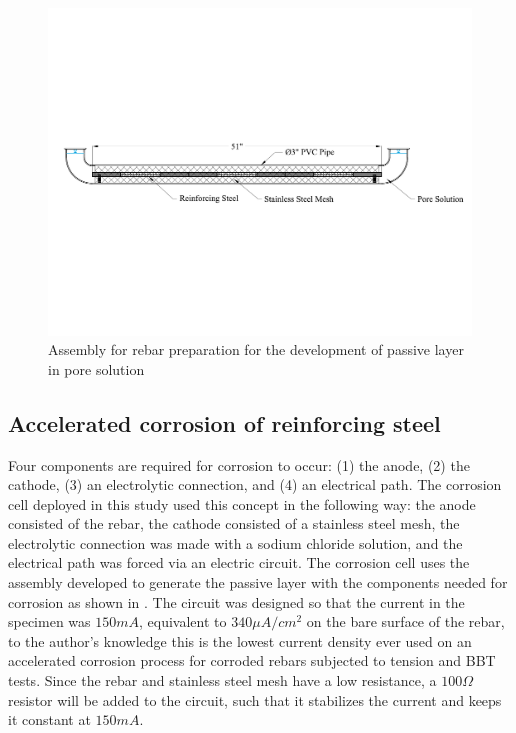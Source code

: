 \begin{figure}[htbp]
	\centering
	\includegraphics[width=1.0\textwidth]{Chapter-3/figs/AnodicPolarization_01}
	\caption{Assembly for rebar preparation for the development of passive layer in pore solution}
	\label{fig:RebarPassivation}
\end{figure}

\newpage
\subsection{Accelerated corrosion  of reinforcing steel}

Four components are required for corrosion to occur: (1) the anode, (2) the cathode, (3) an electrolytic connection, and (4) an electrical path. The corrosion cell deployed in this study used this concept in the following way: the anode consisted of the rebar, the cathode consisted of a stainless steel mesh, the electrolytic connection was made with a sodium chloride solution, and the electrical path was forced via an electric circuit. The corrosion cell uses the assembly developed to generate the passive layer with the components needed for corrosion as shown in . The circuit was designed so that the current in the specimen was $150mA$, equivalent to $340\mu A/cm^2$ on the bare surface of the rebar, to the author's knowledge this is the lowest current density ever used on an accelerated corrosion process for corroded rebars subjected to tension and BBT tests. Since the rebar and stainless steel mesh have a low resistance, a $100\Omega$ resistor will be added to the circuit, such that it stabilizes the current and keeps it constant at $150mA$.

